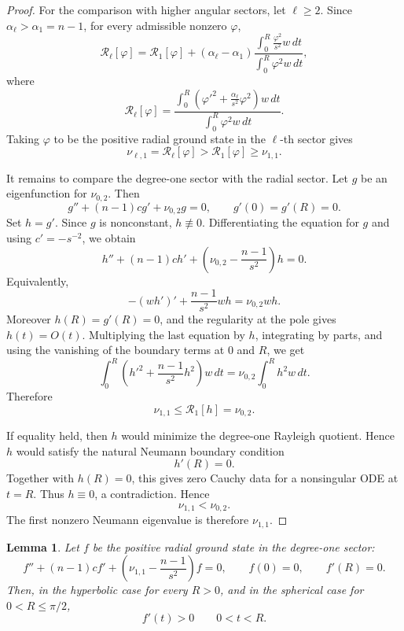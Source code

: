 \documentclass[11pt]{amsart}
\newtheorem{lemma}[theorem]{Lemma}
\theoremstyle{remark}
\begin{document}
\begin{proof}
For the comparison with higher angular sectors, let \(\ell\ge2\).  Since
\(\alpha_\ell>\alpha_1=n-1\), for every admissible nonzero \(\varphi\),
$$
        \mathcal R_\ell[\varphi]
        =
        \mathcal R_1[\varphi]
        +
        (\alpha_\ell-\alpha_1)
        \frac{
        \displaystyle\int_0^R \frac{\varphi^2}{s^2}w\,dt
        }{
        \displaystyle\int_0^R \varphi^2w\,dt
        },
$$
where
$$
        \mathcal R_\ell[\varphi]
        =
        \frac{
        \displaystyle\int_0^R
        \left(\varphi'^2+\frac{\alpha_\ell}{s^2}\varphi^2\right)w\,dt
        }{
        \displaystyle\int_0^R \varphi^2w\,dt
        }.
$$
Taking \(\varphi\) to be the positive radial ground state in the
\(\ell\)-th sector gives
$$
        \nu_{\ell,1}
        =
        \mathcal R_\ell[\varphi]
        >
        \mathcal R_1[\varphi]
        \ge
        \nu_{1,1}.
$$

It remains to compare the degree-one sector with the radial sector.  Let
\(g\) be an eigenfunction for \(\nu_{0,2}\).  Then
$$
        g''+(n-1)cg'+\nu_{0,2}g=0,
        \qquad
        g'(0)=g'(R)=0.
$$
Set \(h=g'\).  Since \(g\) is nonconstant, \(h\not\equiv0\).  Differentiating
the equation for \(g\) and using \(c'=-s^{-2}\), we obtain
$$
        h''
        +(n-1)ch'
        +
        \left(\nu_{0,2}-\frac{n-1}{s^2}\right)h
        =
        0.
$$
Equivalently,
$$
        -(wh')'
        +
        \frac{n-1}{s^2}wh
        =
        \nu_{0,2}wh.
$$
Moreover \(h(R)=g'(R)=0\), and the regularity at the pole gives
\(h(t)=O(t)\).  Multiplying the last equation by \(h\), integrating by parts,
and using the vanishing of the boundary terms at \(0\) and \(R\), we get
$$
        \int_0^R
        \left(h'^2+\frac{n-1}{s^2}h^2\right)w\,dt
        =
        \nu_{0,2}
        \int_0^R h^2w\,dt.
$$
Therefore
$$
        \nu_{1,1}\le \mathcal R_1[h]=\nu_{0,2}.
$$

If equality held, then \(h\) would minimize the degree-one Rayleigh quotient.
Hence \(h\) would satisfy the natural Neumann boundary condition
$$
        h'(R)=0.
$$
Together with \(h(R)=0\), this gives zero Cauchy data for a nonsingular ODE
at \(t=R\).  Thus \(h\equiv0\), a contradiction.  Hence
$$
        \nu_{1,1}<\nu_{0,2}.
$$
The first nonzero Neumann eigenvalue is therefore \(\nu_{1,1}\).
\end{proof}

\begin{lemma}
\label{lem:appendix-f-prime-positive-short}
Let \(f\) be the positive radial ground state in the degree-one sector:
$$
        f''
        +(n-1)cf'
        +
        \left(\nu_{1,1}-\frac{n-1}{s^2}\right)f
        =
        0,
        \qquad
        f(0)=0,
        \qquad
        f'(R)=0.
$$
Then, in the hyperbolic case for every \(R>0\), and in the spherical case
for \(0<R\le\pi/2\),
$$
        f'(t)>0
        \qquad
        0<t<R.
$$
\end{lemma}
\end{document}
